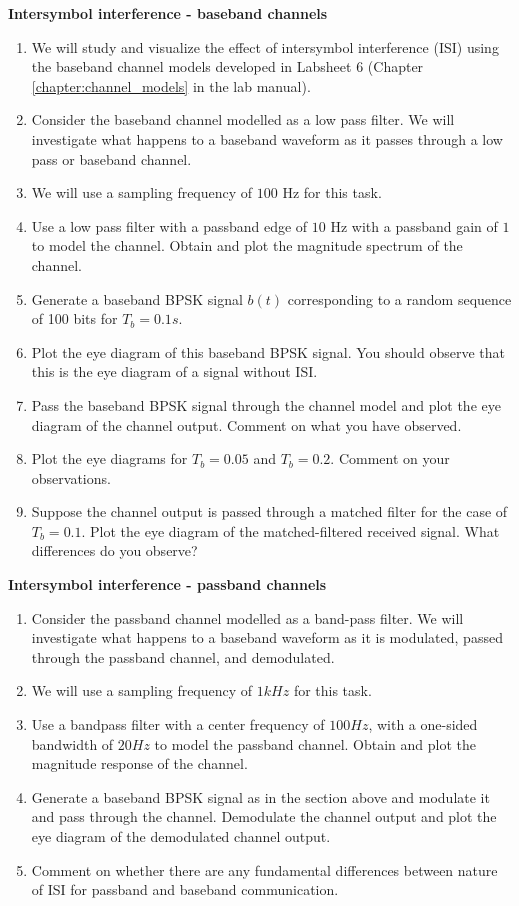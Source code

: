 \textbf{Intersymbol interference - baseband channels}
\begin{enumerate}
\item We will study and visualize the effect of intersymbol interference (ISI) using the baseband channel models developed in Labsheet 6 (Chapter \ref{chapter:channel_models} in the lab manual). 
\item Consider the baseband channel modelled as a low pass filter. We will investigate what happens to a baseband waveform as it passes through a low pass or baseband channel.
\item We will use a sampling frequency of $100$ Hz for this task.
\item Use a low pass filter with a passband edge of $10$ Hz with a passband gain of $1$ to model the channel. Obtain and plot the magnitude spectrum of the channel.
\item Generate a baseband BPSK signal $b(t)$ corresponding to a random sequence of 100 bits for $T_{b} = 0.1s$.
\item Plot the eye diagram of this baseband BPSK signal. You should observe that this is the eye diagram of a signal without ISI.
\item Pass the baseband BPSK signal through the channel model and plot the eye diagram of the channel output. Comment on what you have observed.
\item Plot the eye diagrams for $T_{b} = 0.05$ and $T_{b} = 0.2$. Comment on your observations.
\item Suppose the channel output is passed through a matched filter for the case of $T_{b} = 0.1$. Plot the eye diagram of the matched-filtered received signal. What differences do you observe?
\end{enumerate}

\myhrule
\noindent
\textbf{Intersymbol interference - passband channels}
\begin{enumerate}
\item Consider the passband channel modelled as a band-pass filter. We will investigate what happens to a baseband waveform as it is modulated, passed through the passband channel, and demodulated.
\item We will use a sampling frequency of $1 kHz$ for this task.
\item Use a bandpass filter with a center frequency of $100 Hz$, with a one-sided bandwidth of $20 Hz$ to model the passband channel. Obtain and plot the magnitude response of the channel.
\item Generate a baseband BPSK signal as in the section above and modulate it and pass through the channel. Demodulate the channel output and plot the eye diagram of the demodulated channel output.
\item Comment on whether there are any fundamental differences between nature of ISI for passband and baseband communication.
\end{enumerate}

